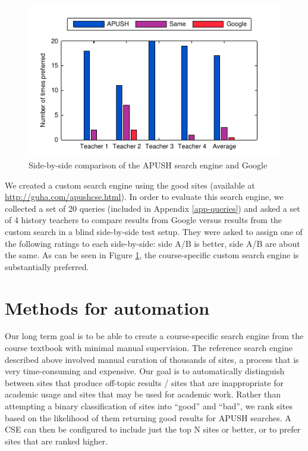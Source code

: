 \documentclass[pdfpagelabels=false,plainpages=true]{acm_proc_article-sp}
\begin{document}
\begin{figure}
\includegraphics{teacher_eval}
\caption{Side-by-side comparison of the APUSH search engine and Google}
\label{fig-eval}
\end{figure}

We created a custom search engine using the good sites (available at
\url{http://guha.com/apushcse.html}). In order to evaluate this search engine,
we collected a set of 20 queries (included in Appendix \ref{app-queries}) and
asked a set of 4 history teachers to compare results from Google versus results
from the custom search in a blind side-by-side test setup. They were asked to
assign one of the following ratings to each side-by-side: side A/B is better,
side A/B are about the same. As can be seen in Figure \ref{fig-eval}, the
course-specific custom search engine is substantially preferred.

\section{Methods for automation}

Our long term goal is to be able to create a course-specific search engine from
the course textbook with minimal manual supervision. The reference search engine
described above involved manual curation of thousands of sites, a process that
is very time-consuming and expensive. Our goal is to automatically distinguish
between sites that produce off-topic results / sites that are inappropriate for
academic usage and sites that may be used for academic work.  Rather than
attempting a binary classification of sites into ``good'' and ``bad'', we rank sites
based on the likelihood of them returning good results for APUSH searches. A CSE
can then be configured to include just the top N sites or better, or to prefer
sites that are ranked higher. 
\end{document}
